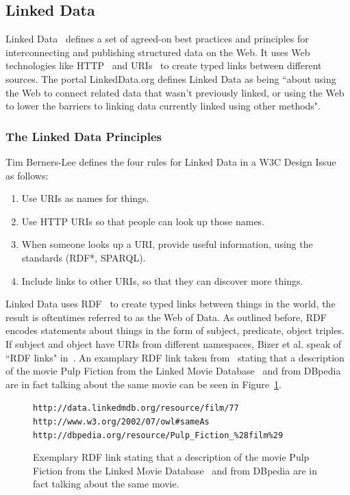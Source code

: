 \documentclass[12pt]{article}
\newenvironment{code}[1]
{\begin{lrbox}{\inverbatim}\begin{minipage}{13.5cm}\begin{alltt}{#1}}
{\end{alltt}\end{minipage}\end{lrbox}\colorbox{lightgray}{\usebox{\inverbatim}}}
\begin{document}
\subsection{Linked Data}
Linked Data~\cite{TimBL:LinkedData} defines a set of agreed-on best practices and principles for interconnecting and publishing structured data on the Web. It uses Web technologies like HTTP~\cite{fielding1999hypertext} and URIs~\cite{bernerslee2005uri} to create typed links between different sources. The portal LinkedData.org defines Linked Data as being ``about using the Web to connect related data that wasn't previously linked, or using the Web to lower the barriers to linking data currently linked using other methods". 

\subsubsection{The Linked Data Principles}
Tim Berners-Lee defines the four rules for Linked Data in a W3C Design Issue~\cite{TimBL:LinkedData} as follows:
\begin{enumerate}
\item Use URIs as names for things.
\item Use HTTP URIs so that people can look up those names.
\item When someone looks up a URI, provide useful information, using the standards (RDF*, SPARQL).
\item Include links to other URIs, so that they can discover more things.
\end{enumerate}

Linked Data uses RDF~\cite{RDF} to create typed links between things in the world, the result is oftentimes referred to as the Web of Data. As outlined before, RDF encodes statements about things in the form of subject, predicate, object triples. If subject and object have URIs from different namespaces, Bizer et al. speak of ``RDF links" in~\cite{bizer07how}. An examplary RDF link taken from~\cite{BizerHB09} stating that a description of the movie Pulp Fiction from the Linked Movie Database~\cite{HasCon09} and from DBpedia are in fact talking about the same movie can be seen in Figure~\ref{code:rdflink}.

\begin{figure}[htbp!]
\begin{center}
{\footnotesize
\begin{code}
http://data.linkedmdb.org/resource/film/77
http://www.w3.org/2002/07/owl\#sameAs
http://dbpedia.org/resource/Pulp\_Fiction\_\%28film\%29
\end{code}}
  \caption[Exemplary RDF link.]{Exemplary RDF link stating that a description of the movie Pulp Fiction from the Linked Movie Database~\cite{HasCon09} and from DBpedia are in fact talking about the same movie.}
  \label{code:rdflink} 
\end{center}    
\end{figure}
\end{document}
